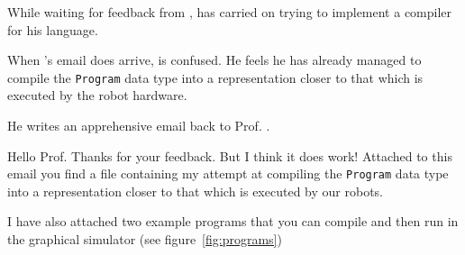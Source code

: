 \vspace{5mm}



\noindent While waiting for feedback from \docname{}, \studname{} has 
carried on trying to implement a compiler for his language. 

When \docname{}'s email does arrive, \studname{} is confused. He feels he 
has already managed to compile the {\tt Program} data type into a 
representation closer to that which is executed by the robot hardware. 

He writes an apprehensive email back to Prof. \docname{}. 

\vspace{5mm}

\noindent\colorbox{light-gray}{
\begin{minipage}[]{0.9\linewidth}
\noindent 
Hello Prof. \docname{} 
\newline \newline
\noindent Thanks for your feedback. But I think it does work! Attached
to this email you find a file containing my attempt at compiling the
{\tt Program} data type into a representation closer to that which is
executed by our robots. \newline \newline


\noindent I have also attached two example programs that you can compile and 
then run in the graphical simulator (see figure~\ref{fig:programs}) \newline \newline







\noindent \studname{} 
\end{minipage} 
}

